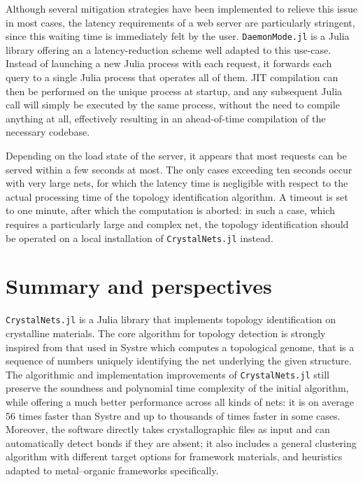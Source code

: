 \documentclass[main.tex]{subfiles}
\begin{document}
Although several mitigation strategies have been implemented to relieve this issue in most cases, the latency requirements of a web server are particularly stringent, since this waiting time is immediately felt by the user. \texttt{DaemonMode.jl} is a Julia library offering an a latency-reduction scheme well adapted to this use-case. Instead of launching a new Julia process with each request, it forwards each query to a single Julia process that operates all of them. JIT compilation can then be performed on the unique process at startup, and any subsequent Julia call will simply be executed by the same process, without the need to compile anything at all, effectively resulting in an ahead-of-time compilation of the necessary codebase.

Depending on the load state of the server, it appears that most requests can be served within a few seconds at most. The only cases exceeding ten seconds occur with very large nets, for which the latency time is negligible with respect to the actual processing time of the topology identification algorithm. A timeout is set to one minute, after which the computation is aborted: in such a case, which requires a particularly large and complex net, the topology identification should be operated on a local installation of \texttt{CrystalNets.jl} instead.

\section{Summary and perspectives}

\texttt{CrystalNets.jl} is a Julia library that implements topology identification on crystalline materials. The core algorithm for topology detection is strongly inspired from that used in Systre \autocite{Systre} which computes a topological genome, that is a sequence of numbers uniquely identifying the net underlying the given structure. The algorithmic and implementation improvements of \texttt{CrystalNets.jl} still preserve the soundness and polynomial time complexity of the initial algorithm, while offering a much better performance across all kinds of nets: it is on average 56 times faster than Systre and up to thousands of times faster in some cases. Moreover, the software directly takes crystallographic files as input and can automatically detect bonds if they are absent; it also includes a general clustering algorithm with different target options for framework materials, and heuristics adapted to metal--organic frameworks specifically.
\end{document}
